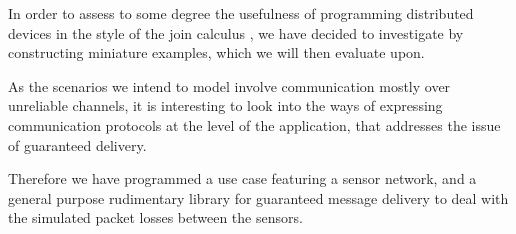 
In order to assess to some degree the usefulness of programming
distributed devices in the style of the join calculus , we have decided to investigate by constructing
miniature examples, which we will then evaluate upon.

As the scenarios we intend to model involve communication mostly over
unreliable channels, it is interesting to look into the ways of
expressing communication protocols at the level of the application,
that addresses the issue of guaranteed delivery.

Therefore we have programmed a use case featuring a sensor network,
and a general purpose rudimentary library for guaranteed message
delivery to deal with the simulated packet losses between the sensors.
